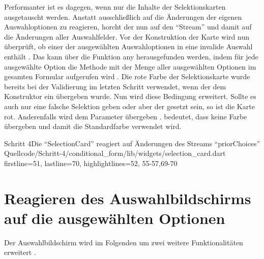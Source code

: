 Performanter ist es dagegen,
wenn nur die Inhalte der Selektionskarten ausgetauscht werden.
Anstatt ausschließlich auf die Änderungen der eigenen Auswahloptionen zu reagieren,
horcht der  nun auf den \enquote{Stream}  
und damit auf die Änderungen aller Auswahlfelder.
Vor der Konstruktion der Karte wird nun überprüft,
ob einer der ausgewählten Auswahloptionen in  eine invalide Auswahl enthält .
Das kann über die Funktion any herausgefunden werden,
indem  für jede ausgewählte Option die Methode  mit der Menge aller ausgewählten Optionen im gesamten Formular aufgerufen wird . 
Die rote Farbe der Selektionskarte wurde bereits bei der Validierung im letzten Schritt verwendet,
wenn der dem Konstruktor ein  übergeben wurde.
Nun wird diese Bedingung erweitert.
Sollte es auch nur eine falsche Selektion geben
oder aber der  gesetzt sein,
so ist die Karte rot.
Anderenfalls wird dem Parameter   übergeben .
 bedeutet, dass keine Farbe übergeben und damit die Standardfarbe verwendet wird.

\begin{alexlisting}{Schritt 4}{Die \enquote{SelectionCard} reagiert auf Änderungen des Streams \enquote{priorChoices}}
  {Quellcode/Schritt-4/conditional_form/lib/widgets/selection_card.dart}
  {firstline=51, lastline=70, highlightlines={52, 55-57,69-70}}
  \label{lst:Schritt4StreamBuilderpriorChoices}
\end{alexlisting} 


\section{Reagieren des Auswahlbildschirms auf die ausgewählten Optionen}



Der Auswahlbildschirm wird im Folgenden um zwei weitere Funktionalitäten erweitert \Lst{\ref{lst:Schritt4selectedAndSelectableChoices}}.

